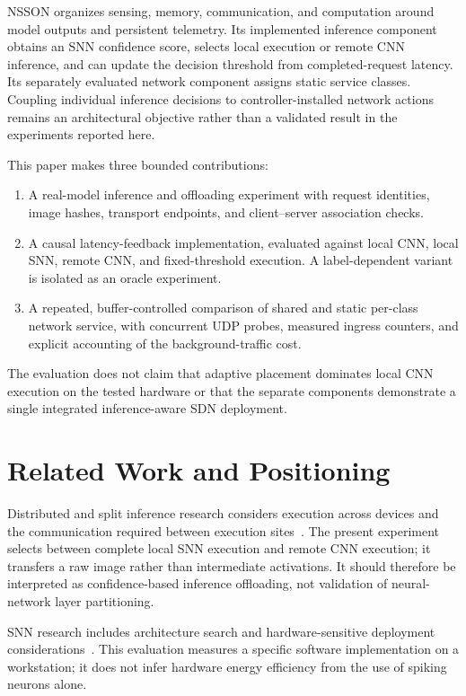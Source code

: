 \documentclass[journal]{IEEEtran}
\begin{document}
NSSON organizes sensing, memory, communication, and computation around model outputs and persistent telemetry. Its implemented inference component obtains an SNN confidence score, selects local execution or remote CNN inference, and can update the decision threshold from completed-request latency. Its separately evaluated network component assigns static service classes. Coupling individual inference decisions to controller-installed network actions remains an architectural objective rather than a validated result in the experiments reported here.

This paper makes three bounded contributions:
\begin{enumerate}
\item A real-model inference and offloading experiment with request identities, image hashes, transport endpoints, and client--server association checks.
\item A causal latency-feedback implementation, evaluated against local CNN, local SNN, remote CNN, and fixed-threshold execution. A label-dependent variant is isolated as an oracle experiment.
\item A repeated, buffer-controlled comparison of shared and static per-class network service, with concurrent UDP probes, measured ingress counters, and explicit accounting of the background-traffic cost.
\end{enumerate}
The evaluation does not claim that adaptive placement dominates local CNN execution on the tested hardware or that the separate components demonstrate a single integrated inference-aware SDN deployment.

\section{Related Work and Positioning}
\label{sec:background}
Distributed and split inference research considers execution across devices and the communication required between execution sites~\cite{teerapittayanon2017distributed,chang2021survey}. The present experiment selects between complete local SNN execution and remote CNN execution; it transfers a raw image rather than intermediate activations. It should therefore be interpreted as confidence-based inference offloading, not validation of neural-network layer partitioning.

SNN research includes architecture search and hardware-sensitive deployment considerations~\cite{putra2025spikenas,kim2022neural}. This evaluation measures a specific software implementation on a workstation; it does not infer hardware energy efficiency from the use of spiking neurons alone.
\end{document}
